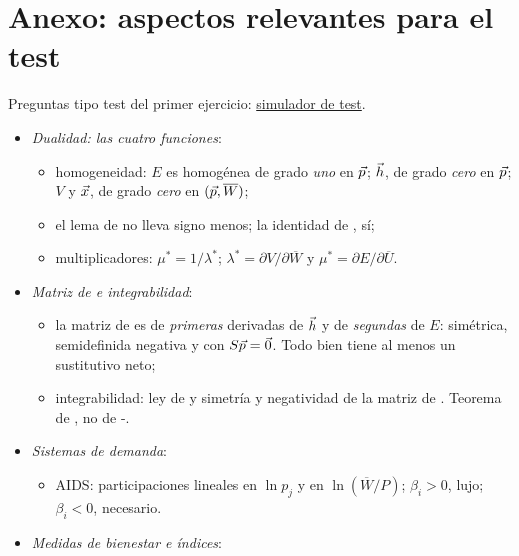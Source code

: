 \documentclass[11pt]{article}
\begin{document}
\clearpage
\section{Anexo: aspectos relevantes para el test}\label{anexo:test}

\begin{anotaciones}
Preguntas tipo test del primer ejercicio: \href{https://www.victorgutierrezmarcos.es/oposicion/temario/primer-ejercicio/test/simulador.html?tema=3.A.9}{simulador de test}.
\end{anotaciones}

\begin{itemize}
\item \emph{Dualidad: las cuatro funciones}:
  \begin{itemize}
  \item homogeneidad: $E$ es homogénea de grado \emph{uno} en $\vec{p}$; $\vec{h}$, de grado \emph{cero} en $\vec{p}$; $V$ y $\vec{x}$, de grado \emph{cero} en $(\vec{p},\overline{W})$;
  \item el lema de  no lleva signo menos; la identidad de , sí;
  \item multiplicadores: $\mu^*=1/\lambda^*$; $\lambda^*=\partial V/\partial\overline{W}$ y $\mu^*=\partial E/\partial\overline{U}$.
  \end{itemize}
\item \emph{Matriz de  e integrabilidad}:
  \begin{itemize}
  \item la matriz de  es de \emph{primeras} derivadas de $\vec{h}$ y de \emph{segundas} de $E$: simétrica, semidefinida negativa y con $S\vec{p}=\vec{0}$. Todo bien tiene al menos un sustitutivo neto;
  \item integrabilidad: ley de  y simetría y negatividad de la matriz de . Teorema de , no de -.
  \end{itemize}
\item \emph{Sistemas de demanda}:
  \begin{itemize}
  \item AIDS: participaciones lineales en $\ln p_j$ y en $\ln(\overline{W}/P)$; $\beta_i>0$, lujo; $\beta_i<0$, necesario.
  \end{itemize}
\item \emph{Medidas de bienestar e índices}:
  \begin{itemize}

\end{itemize}
\end{itemize}
\end{document}
